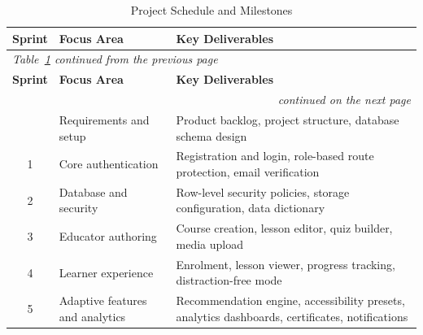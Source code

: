 \documentclass[12pt, oneside]{article} %
\begin{document}
{
\renewcommand{\arraystretch}{1.3}
\footnotesize
\begin{longtable}{|c|l|p{7cm}|}
\caption{Project Schedule and Milestones}
\label{tab:project_schedule}\\
\hline
\textbf{Sprint} & \textbf{Focus Area} & \textbf{Key Deliverables} \\ \hline \hline
\endfirsthead
\multicolumn{3}{l}{\footnotesize\itshape Table~\ref{tab:project_schedule} continued from the previous page}\\
\hline
\textbf{Sprint} & \textbf{Focus Area} & \textbf{Key Deliverables} \\ \hline \hline
\endhead
\hline
\multicolumn{3}{r}{\footnotesize\itshape continued on the next page}\\
\endfoot
\endlastfoot
0 & Requirements and setup & Product backlog, project structure, database schema design \\ \hline
1 & Core authentication & Registration and login, role-based route protection, email verification \\ \hline
2 & Database and security & Row-level security policies, storage configuration, data dictionary \\ \hline
3 & Educator authoring & Course creation, lesson editor, quiz builder, media upload \\ \hline
4 & Learner experience & Enrolment, lesson viewer, progress tracking, distraction-free mode \\ \hline
5 & Adaptive features and analytics & Recommendation engine, accessibility presets, analytics dashboards, certificates, notifications \\ \hline
\end{longtable}
}
\end{document}
